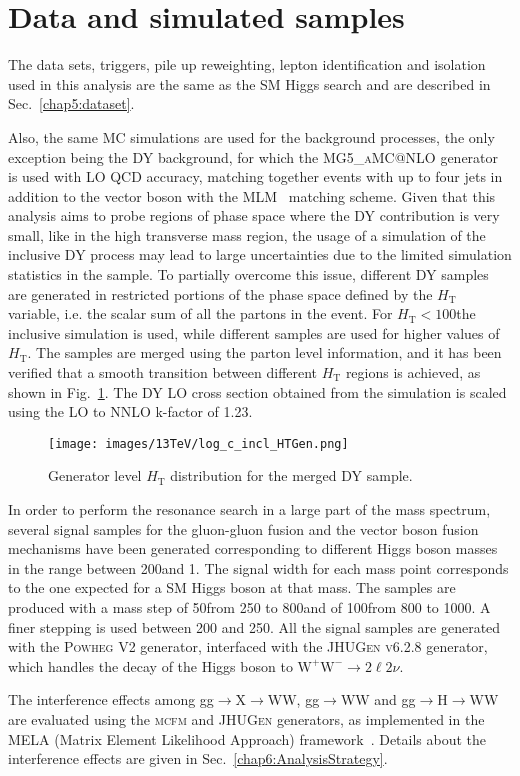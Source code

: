 \section{Data and simulated samples}\label{chap6:datatsets}

The data sets, triggers, pile up reweighting, lepton identification and isolation used in this analysis are the same as the SM Higgs search and are described in Sec.~\ref{chap5:dataset}.

Also, the same MC simulations are used for the background processes, the only exception being the DY background, for which the \textsc{MG5\_aMC@NLO} generator is used with LO QCD accuracy, matching together events with up to four jets in addition to the vector boson with the MLM~\cite{Alwall:2007fs} matching scheme. Given that this analysis aims to probe regions of phase space where the DY contribution is very small, like in the high transverse mass region, the usage of a simulation of the inclusive DY process may lead to large uncertainties due to the limited simulation statistics in the sample. To partially overcome this issue, different DY samples are generated in restricted portions of the phase space defined by the $H_\mathrm{T}$ variable, i.e. the scalar sum of all the partons \pt in the event. For $H_\mathrm{T}< 100$\GeV the inclusive simulation is used, while different samples are used for higher values of $H_\mathrm{T}$. The samples are merged using the parton level information, and it has been verified that a smooth transition between different $H_\mathrm{T}$ regions is achieved, as shown in Fig.~\ref{fig:DY_HT}.
The DY LO cross section obtained from the simulation is scaled using the LO to NNLO k-factor of 1.23.

\begin{figure}[htbp]
\centering
\texttt{[image: images/13TeV/log\_c\_incl\_HTGen.png]}
\caption{
    Generator level $H_\mathrm{T}$ distribution for the merged DY sample.}
    \label{fig:DY_HT}
\end{figure}

In order to perform the resonance search in a large part of the mass spectrum, several signal samples for the gluon-gluon fusion and the vector boson fusion mechanisms have been generated corresponding to different Higgs boson masses in the range between 200\GeV and 1\TeV. The signal width for each mass point corresponds to the one expected for a SM Higgs boson at that mass. The samples are produced with a mass step of 50\GeV from 250 to 800\GeV and of 100\GeV from 800 to 1000\GeV. A finer stepping is used between 200 and 250\GeV. All the signal samples are generated with the \textsc{Powheg V2} generator, interfaced with the \textsc{JHUGen v6.2.8} generator, which handles the decay of the Higgs boson to $\mathrm{W^+ W^-}\to2\ell2\nu$.

The interference effects among gg$\to$X$\to$WW, gg$\to$WW and gg$\to$H$\to$WW are evaluated using the  \textsc{mcfm} and \textsc{JHUGen} generators, as implemented in the MELA (Matrix Element Likelihood Approach) framework~\cite{JHUGen}. Details about the interference effects are given in Sec.~\ref{chap6:AnalysisStrategy}.
